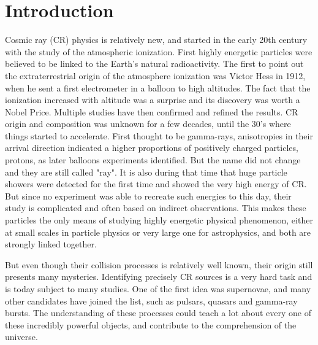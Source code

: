 \chapter*{Introduction}
\label{ch:introduction}

%
%
%
%	

Cosmic ray (CR) physics is relatively new, and started in the early 20th century with the study of the atmospheric ionization. First highly energetic particles were believed to be linked to the Earth's natural radioactivity. The first to point out the extraterrestrial origin of the atmosphere ionization was Victor Hess in 1912, when he sent a first electrometer in a balloon to high altitudes. The fact that the ionization increased with altitude was a surprise and its discovery was worth a Nobel Price. Multiple studies have then confirmed and refined the results. CR origin and composition was unknown for a few decades, until the 30's where things started to accelerate. First thought to be gamma-rays, anisotropies in their arrival direction indicated a higher proportions of positively charged particles, protons, as later balloons experiments identified. But the name did not change and they are still called "ray". It is also during that time that huge particle showers were detected for the first time and showed the very high energy of CR. But since no experiment was able to recreate such energies to this day, their study is complicated and often based on indirect observations. This makes these particles the only means of studying highly energetic physical phenomenon, either at small scales in particle physics or very large one for astrophysics, and both are strongly linked together. 

But even though their collision processes is relatively well known, their origin still presents many mysteries. Identifying precisely CR sources is a very hard task and is today subject to many studies. One of the first idea was supernovae, and many other candidates have joined the list, such as pulsars, quasars and gamma-ray bursts. The understanding of these processes could teach a lot about every one of these incredibly powerful objects, and contribute to the comprehension of the universe.


